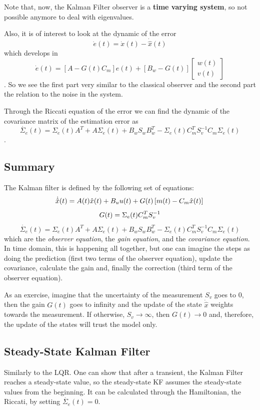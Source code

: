 Note that, now, the Kalman Filter observer is a \textbf{time varying system}, so not possible anymore to deal with eigenvalues.

Also, it is of interest to look at the dynamic of the error \[
    \dot{e}(t)=\dot{x}(t)-\dot{\hat{x}}(t)
\] which develops in \[
\dot{e}(t)=\left[ A-G(t)C_m \right] e(t) + \left[ B_w-G(t) \right] \begin{bmatrix} w(t) \\ v(t) \end{bmatrix} 
\]. So we see the first part very similar to the classical observer and the second part the relation to the noise in the system.

Through the Riccati equation of the error we can find the dynamic of the covariance matrix of the estimation error as \[
\dot{\Sigma_e}(t)=\Sigma_e(t)A^{T} + A\Sigma_e(t)+B_wS_wB_w^{T}-\Sigma_e(t)C_m^{T}S_v^{-1}C_m\Sigma_e(t)
\].

\subsection*{Summary}

The Kalman filter is defined by the following set of equations: \[
    \dot{\hat{x}}(t)=A(t)\hat{x}(t)+B_uu(t) +G(t)\left[ m(t)-C_m\hat{x}(t) \right]  \\
\] \[
G(t)=\Sigma_e(t)C_m^{T}S_v^{-1} \\
\] \[
\dot{\Sigma_e}(t)=\Sigma_e(t)A^{T} + A\Sigma_e(t)+B_wS_wB_w^{T}-\Sigma_e(t)C_m^{T}S_v^{-1}C_m\Sigma_e(t)
\] which are the \emph{observer equation}, the \emph{gain equation}, and the \emph{covariance equation}. In time domain, this is happening all together, but one can imagine the steps as doing the prediction (first two terms of the observer equation), update the covariance, calculate the gain and, finally the correction (third term of the observer equation).

As an exercise, imagine that the uncertainty of the measurement $S_v$ goes to 0, then the gain $G(t)$ goes to infinity and the update of the state $\dot{\hat{x}}$ weights towards the measurement. If otherwise, $S_v \to \infty$, then $G(t)\to 0$ and, therefore, the update of the states will trust the model only.

\subsection*{Steady-State Kalman Filter}

Similarly to the LQR. One can show that after a transient, the Kalman Filter reaches a steady-state value, so the steady-state KF assumes the steady-state values from the beginning. It can be calculated through the Hamiltonian, the Riccati, by setting $\dot{\Sigma_e}(t)=0 $.


